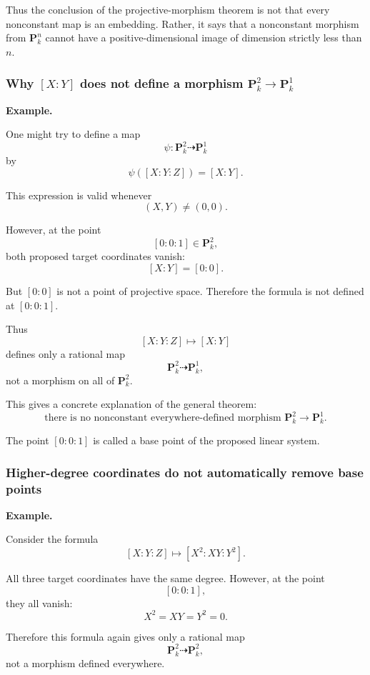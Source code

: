 \documentclass[12pt,a4paper]{article}
\theoremstyle{notespace}
\begin{document}
Thus the conclusion of the projective-morphism theorem is not that every nonconstant map is an embedding. Rather, it says that a nonconstant morphism from \(\mathbf P^n_k\) cannot have a positive-dimensional image of dimension strictly less than \(n\).

\subsubsection{\texorpdfstring{Why \([X:Y]\) does not define a morphism \(\mathbf P^2_k\to\mathbf P^1_k\)}{An invalid projection}}

\textbf{Example.}

One might try to define a map
\[
\psi:\mathbf P^2_k\dashrightarrow\mathbf P^1_k
\]
by
\[
\psi([X:Y:Z])=[X:Y].
\]

This expression is valid whenever
\[
(X,Y)\neq(0,0).
\]

However, at the point
\[
[0:0:1]\in\mathbf P^2_k,
\]
both proposed target coordinates vanish:
\[
[X:Y]=[0:0].
\]

But \([0:0]\) is not a point of projective space. Therefore the formula is not defined at \([0:0:1]\).

Thus
\[
[X:Y:Z]\longmapsto[X:Y]
\]
defines only a rational map
\[
\mathbf P^2_k\dashrightarrow\mathbf P^1_k,
\]
not a morphism on all of \(\mathbf P^2_k\).

This gives a concrete explanation of the general theorem:
\[
\boxed{
	\text{there is no nonconstant everywhere-defined morphism }
	\mathbf P^2_k\longrightarrow\mathbf P^1_k.
}
\]

The point \([0:0:1]\) is called a base point of the proposed linear system.

\subsubsection{Higher-degree coordinates do not automatically remove base points}

\textbf{Example.}

Consider the formula
\[
[X:Y:Z]
\longmapsto
[X^2:XY:Y^2].
\]

All three target coordinates have the same degree. However, at the point
\[
[0:0:1],
\]
they all vanish:
\[
X^2=XY=Y^2=0.
\]

Therefore this formula again gives only a rational map
\[
\mathbf P^2_k\dashrightarrow\mathbf P^2_k,
\]
not a morphism defined everywhere.
\end{document}
